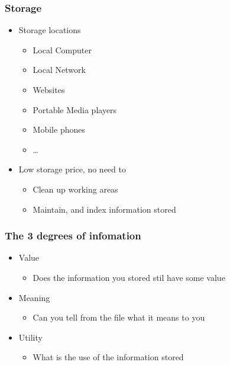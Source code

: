 \documentclass{beamer}
\begin{document}
\begin{frame}
\frametitle{Storage}

\begin{itemize}
  \item Storage locations
  \begin{itemize}
  	\item Local Computer
  	\item Local Network
  	\item Websites
  	\item Portable Media players
  	\item Mobile phones
  	\item \ldots
  \end{itemize}
  \item Low storage price, no need to
  \begin{itemize}
  	\item Clean up working areas
  	\item Maintain, and index information stored
  \end{itemize}
  
\end{itemize}
\end{frame}

\begin{frame}
\frametitle{The 3 degrees of infomation}

\begin{itemize}
  \item Value
  \begin{itemize}
    \item Does the information you stored stil have some value
  \end{itemize}
  \item Meaning
  \begin{itemize}
    \item Can you tell from the file what it means to you
  \end{itemize}
  \item Utility
  \begin{itemize}
    \item What is the use of the information stored
  \end{itemize}
\end{itemize}

\end{frame}
\end{document}
